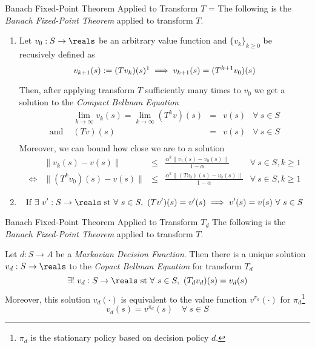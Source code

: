 \documentclass[11pt,a4paper]{article}
\begin{document}
  \begin{theorem}{Banach Fixed-Point Theorem Applied to Transform $T$}
    \everymath={\displaystyle}
    The following is the \textit{Banach Fixed-Point Theorem} applied to transform $T$.
    \begin{enumerate}
      \item Let $v_0:S\to\reals$ be an arbitrary value function and $\{v_k\}_{k\geq0}$ be recusively defined as
      \[ v_{k+1}(s):=(Tv_k)(s)\footnotemark\implies v_{k+1}(s)=(T^{k+1}v_0)(s) \]
      \par Then, after applying transform $T$ sufficiently many times to $v_0$ we get a solution to the \textit{Compact Bellman Equation}
      \[\begin{array}{rrcll}
        &\lim_{k\to\infty}v_k(s)=\lim_{k\to\infty}(T^kv)(s)&=&v(s)&\forall\ s\in S\\
        \text{and }&(Tv)(s)&=&v(s)&\forall\ s\in S\\
      \end{array}\]
      Moreover, we can bound how close we are to a solution
      \[\begin{array}{rrcll}
        &\|v_k(s)-v(s)\|&\leq&\frac{\alpha^k\|v_1(s)-v_0(s)\|}{1-\alpha}&\forall\ s\in S,k\geq1\\
        \Longleftrightarrow&\|(T^kv_0)(s)-v(s)\|&\leq&\frac{\alpha^k\|(Tv_0)(s)-v_0(s)\|}{1-\alpha}&\forall\ s\in S,k\geq1
      \end{array}\]
      \item
        \[\text{If }\exists\ v':S\to\reals\text{ st }\forall\ s\in S,\ (Tv')(s)=v'(s)\implies v'(s)=v(s)\ \forall\ s\in S  \]
    \end{enumerate}
  \end{theorem}

  \begin{theorem}{Banach Fixed-Point Theorem Applied to Transform $T_d$}
    The following is the \textit{Banach Fixed-Point Theorem} applied to transform $T$.
    \par Let $d:S\to A$ be a \textit{Markovian Decision Function}. Then there is a unique solution $v_d:S\to\reals$ to the \textit{Copact Bellman Equation} for transform $T_d$
    \[ \exists!\ v_d:S\to\reals\text{ st }\forall\ s\in S,\ (T_dv_d)(s)=v_d(s) \]
    Moreover, this solution $v_d(\cdot)$ is equivalent to the value function $v^{\pi_d}(\cdot)$ for $\pi_d$\footnote{$\pi_d$ is the stationary policy based on decision policy $d$.}
    \[ v_d(s)=v^{\pi_d}(s)\quad\forall\ s\in S \]
  \end{theorem}
\end{document}
